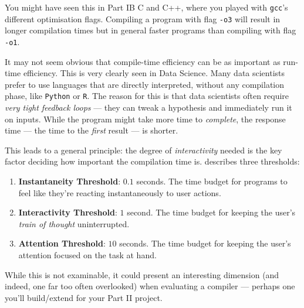You might have seen this in {\sffamily Part IB C and C++}, where you played with \texttt{gcc}'s different optimisation flags. Compiling a program with flag \texttt{-o3} will result in longer compilation times but in general faster programs than compiling with flag \texttt{-o1}.

It may not seem obvious that compile-time efficiency can be as important as run-time efficiency. This is very clearly seen in Data Science. Many data scientists prefer to use languages that are directly interpreted, without any compilation phase, like \texttt{Python} or \texttt{R}. The reason for this is that data scientists often require \emph{very tight feedback loops} --- they can tweak a hypothesis and immediately run it on inputs. While the program might take more time to \emph{complete}, the response time --- the time to the \emph{first} result --- is shorter. 

This leads to a general principle: the degree of \emph{interactivity} needed is the key factor deciding how important the compilation time is. \citet{nielsen-1993} describes three thresholds:

\begin{enumerate}
    \item \textbf{Instantaneity Threshold}: $0.1$ seconds. The time budget for programs to feel like they're reacting instantaneously to user actions. 
    \item \textbf{Interactivity Threshold}: $1$ second. The time budget for keeping the user's \emph{train of thought} uninterrupted.
    \item \textbf{Attention Threshold}: $10$ seconds. The time budget for keeping the user's attention focused on the task at hand.
\end{enumerate}

While this is not examinable, it could present an interesting dimension (and indeed, one far too often overlooked) when evaluating a compiler --- perhaps one you'll build/extend for your Part II project.